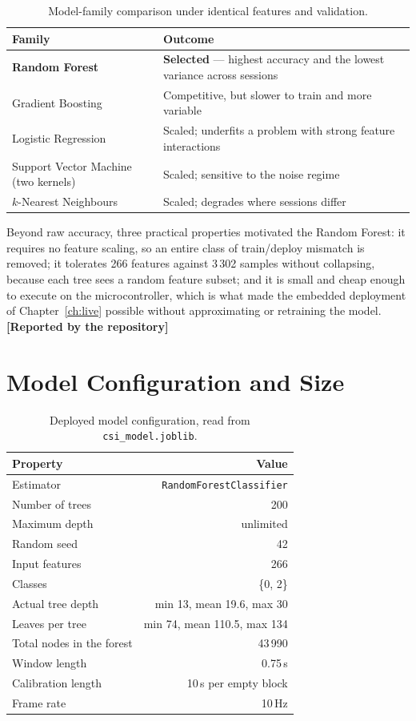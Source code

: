 \documentclass[11pt,a4paper,oneside]{report}
\newcommand{\evidencetag}[2]{{\small\sffamily\bfseries\textcolor{#1}{[#2]}}}
\newcommand{\Repo}{\evidencetag{neutralgrey}{Reported by the repository}}
\newcommand{\code}[1]{\texttt{\small #1}}
\begin{document}
\begin{table}[H]
\centering
\caption{Model-family comparison under identical features and validation.}
\label{tab:models}
\begin{tabularx}{\linewidth}{@{}lX@{}}
\toprule
\textbf{Family} & \textbf{Outcome} \\
\midrule
\textbf{Random Forest} & \textbf{Selected} --- highest accuracy and the lowest
variance across sessions \\
Gradient Boosting & Competitive, but slower to train and more variable \\
Logistic Regression & Scaled; underfits a problem with strong feature interactions \\
Support Vector Machine (two kernels) & Scaled; sensitive to the noise regime \\
$k$-Nearest Neighbours & Scaled; degrades where sessions differ \\
\bottomrule
\end{tabularx}
\end{table}

\noindent
Beyond raw accuracy, three practical properties motivated the Random Forest:
it requires no feature scaling, so an entire class of train/deploy mismatch is
removed; it tolerates 266 features against 3\,302 samples without collapsing,
because each tree sees a random feature subset; and it is small and cheap
enough to execute on the microcontroller, which is what made the embedded
deployment of Chapter~\ref{ch:live} possible without approximating or
retraining the model. \Repo

\section{Model Configuration and Size}

\begin{table}[H]
\centering
\caption{Deployed model configuration, read from \code{csi\_model.joblib}.}
\label{tab:modelcfg}
\begin{tabular}{@{}lr@{}}
\toprule
\textbf{Property} & \textbf{Value} \\
\midrule
Estimator                  & \code{RandomForestClassifier} \\
Number of trees            & 200 \\
Maximum depth              & unlimited \\
Random seed                & 42 \\
Input features             & 266 \\
Classes                    & \{0, 2\} \\
Actual tree depth          & min 13, mean 19.6, max 30 \\
Leaves per tree            & min 74, mean 110.5, max 134 \\
Total nodes in the forest  & 43\,990 \\
Window length              & 0.75\,s \\
Calibration length         & 10\,s per empty block \\
Frame rate                 & 10\,Hz \\
\bottomrule
\end{tabular}
\end{table}
\end{document}
